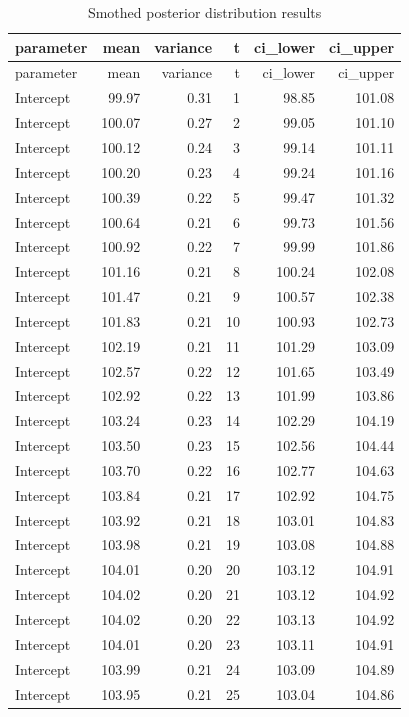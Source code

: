 \documentclass[
]{article}
\begin{document}
\begin{longtable}[]{@{}lrrrrr@{}}
\caption{Smothed posterior distribution results}\tabularnewline
\toprule
parameter & mean & variance & t & ci\_lower & ci\_upper \\
\midrule
\endfirsthead
\toprule
parameter & mean & variance & t & ci\_lower & ci\_upper \\
\midrule
\endhead
Intercept & 99.97 & 0.31 & 1 & 98.85 & 101.08 \\
Intercept & 100.07 & 0.27 & 2 & 99.05 & 101.10 \\
Intercept & 100.12 & 0.24 & 3 & 99.14 & 101.11 \\
Intercept & 100.20 & 0.23 & 4 & 99.24 & 101.16 \\
Intercept & 100.39 & 0.22 & 5 & 99.47 & 101.32 \\
Intercept & 100.64 & 0.21 & 6 & 99.73 & 101.56 \\
Intercept & 100.92 & 0.22 & 7 & 99.99 & 101.86 \\
Intercept & 101.16 & 0.21 & 8 & 100.24 & 102.08 \\
Intercept & 101.47 & 0.21 & 9 & 100.57 & 102.38 \\
Intercept & 101.83 & 0.21 & 10 & 100.93 & 102.73 \\
Intercept & 102.19 & 0.21 & 11 & 101.29 & 103.09 \\
Intercept & 102.57 & 0.22 & 12 & 101.65 & 103.49 \\
Intercept & 102.92 & 0.22 & 13 & 101.99 & 103.86 \\
Intercept & 103.24 & 0.23 & 14 & 102.29 & 104.19 \\
Intercept & 103.50 & 0.23 & 15 & 102.56 & 104.44 \\
Intercept & 103.70 & 0.22 & 16 & 102.77 & 104.63 \\
Intercept & 103.84 & 0.21 & 17 & 102.92 & 104.75 \\
Intercept & 103.92 & 0.21 & 18 & 103.01 & 104.83 \\
Intercept & 103.98 & 0.21 & 19 & 103.08 & 104.88 \\
Intercept & 104.01 & 0.20 & 20 & 103.12 & 104.91 \\
Intercept & 104.02 & 0.20 & 21 & 103.12 & 104.92 \\
Intercept & 104.02 & 0.20 & 22 & 103.13 & 104.92 \\
Intercept & 104.01 & 0.20 & 23 & 103.11 & 104.91 \\
Intercept & 103.99 & 0.21 & 24 & 103.09 & 104.89 \\
Intercept & 103.95 & 0.21 & 25 & 103.04 & 104.86 \\

\end{longtable}
\end{document}
